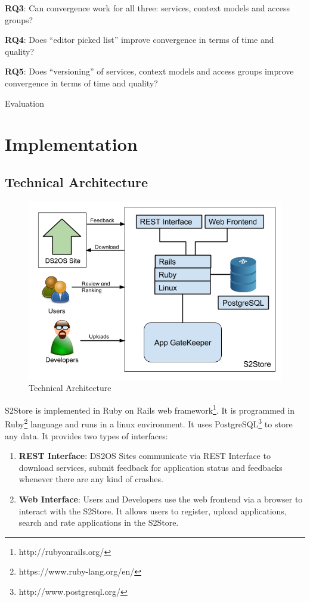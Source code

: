 \textbf{RQ3}: Can convergence work for all three: services, context models and access groups?

\textbf{RQ4}: Does ``editor picked list'' improve convergence in terms of time and quality?

\textbf{RQ5}: Does ``versioning'' of services, context models and access groups improve convergence in terms of time and quality?

Evaluation

\section{Implementation}

\subsection{Technical Architecture}

\begin{figure}[!htb]
  \centering
  \includegraphics[width=14cm]{figures/technical_architecture.png}
  \caption{Technical Architecture}
  \label{fig:technical-architecture}
\end{figure}

S2Store is implemented in Ruby on Rails web framework\footnote{http://rubyonrails.org/}. It is programmed in Ruby\footnote{https://www.ruby-lang.org/en/} language and runs in a linux environment. It uses PostgreSQL\footnote{http://www.postgresql.org/} to store any data. It provides two types of interfaces:

\begin{enumerate}
  \item \textbf{REST Interface}: DS2OS Sites communicate via REST Interface to download services, submit feedback for application status and feedbacks whenever there are any kind of crashes.
  \item \textbf{Web Interface}: Users and Developers use the web frontend via a browser to interact with the S2Store. It allows users to register, upload applications, search and rate applications in the S2Store.
\end{enumerate}

